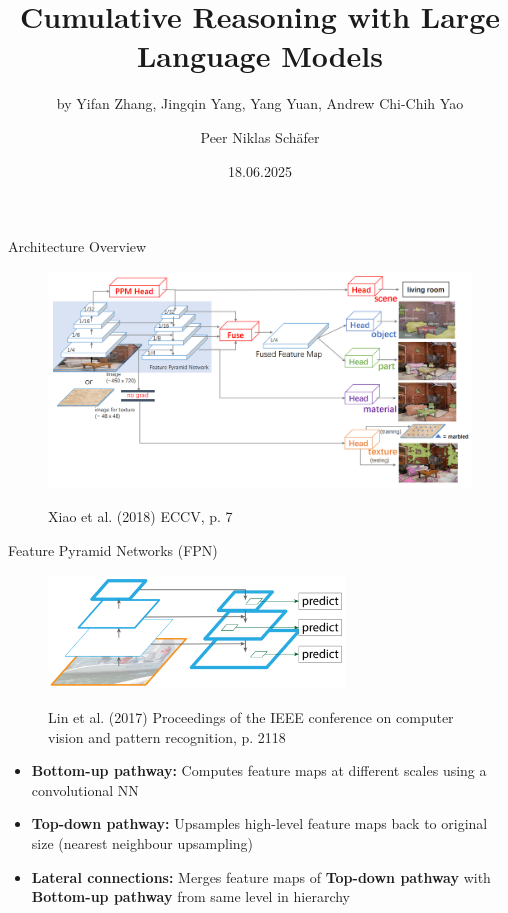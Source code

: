 \documentclass{beamer}
\title[]{Cumulative Reasoning with Large Language Models}
\subtitle{by Yifan Zhang, Jingqin Yang, Yang Yuan, Andrew Chi-Chih Yao}
\author{Peer Niklas Schäfer}
\institute{University of Cologne}
\date{18.06.2025}
\begin{document}
\begin{frame}
    \titlepage
\end{frame}


\begin{frame}{Architecture Overview}
    \begin{figure}
        \centering
        \includegraphics[width=\textwidth]{Images/UPerNetArchitectureOverview_noHeads.png}

        \vspace{0.5em}
        {\tiny Xiao et al. (2018) ECCV, p. 7}
    \end{figure}
\end{frame}


\begin{frame}{Feature Pyramid Networks (FPN)}
    \begin{figure}
        \centering
        \includegraphics[width=0.7\textwidth]{Images/FPNOverview.png}

        \vspace{0.5em}
        {\tiny Lin et al. (2017) Proceedings of the IEEE conference on computer vision and pattern recognition, p. 2118}
    \end{figure}
    \begin{itemize}
        \item \textbf{Bottom-up pathway:} Computes feature maps at different scales using a convolutional NN
        \item \textbf{Top-down pathway:} Upsamples high-level feature maps back to original size (nearest neighbour upsampling)
        \item \textbf{Lateral connections:} Merges feature maps of \textbf{Top-down pathway} with \textbf{Bottom-up pathway} from same level in hierarchy
    \end{itemize}
\end{frame}
\end{document}
